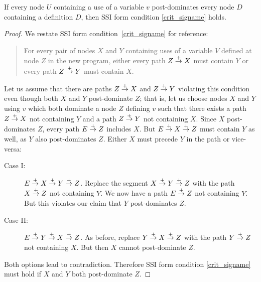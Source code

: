 \documentclass[12pt,titlepage,twoside]{article}
\begin{document}
\begin{lemma}\label{lem:rename_postdom1}
If every node $U$ containing a use of a variable $v$ post-dominates
every node $D$ containing a definition $D$, then SSI form condition
\ref{crit_signame} holds.
\end{lemma}
\begin{proof}
We restate SSI form condition~\ref{crit_signame} for reference:
\begin{quote}
For every pair of nodes $X$ and $Y$ containing uses of a
variable $V$ defined at node $Z$ in the new program, either every path
$Z \stackrel{+}{\rightarrow} X$ must contain $Y$ or every path $Z \stackrel{+}{\rightarrow} Y$ must
contain $X$.
\end{quote}
Let us assume that there are paths $Z\stackrel{+}{\rightarrow} X$ and $Z\stackrel{+}{\rightarrow} Y$
violating this condition even though both $X$ and $Y$ post-dominate
$Z$; that is, let us choose nodes $X$ and $Y$ using $v$ which both
dominate a node $Z$ defining $v$ such that there exists a path
$Z\stackrel{+}{\rightarrow} X$ not containing $Y$ and a path $Z\stackrel{+}{\rightarrow} Y$ not
containing $X$.  Since $X$ post-dominates $Z$, every path $E\stackrel{+}{\rightarrow}
Z$ includes $X$.  But $E \stackrel{+}{\rightarrow} X \stackrel{+}{\rightarrow} Z$ must contain $Y$ as
well, as $Y$ also post-dominates $Z$.  Either $X$ must precede $Y$ in
the path or vice-versa:
\begin{description}
\item[Case I:] $E \stackrel{+}{\rightarrow} X \stackrel{+}{\rightarrow} Y \stackrel{+}{\rightarrow} Z$.  Replace the
segment $X\stackrel{+}{\rightarrow} Y\stackrel{+}{\rightarrow} Z$ with the path $X\stackrel{+}{\rightarrow} Z$ not
containing $Y$.  We now have a path $E\stackrel{+}{\rightarrow} Z$ not containing
$Y$.  But this violates our claim that $Y$ post-dominates $Z$.
\item[Case II:] $E \stackrel{+}{\rightarrow} Y \stackrel{+}{\rightarrow} X \stackrel{+}{\rightarrow} Z$.  As before,
replace $Y\stackrel{+}{\rightarrow} X\stackrel{+}{\rightarrow} Z$ with the path $Y\stackrel{+}{\rightarrow} Z$ not
containing $X$.  But then $X$ cannot post-dominate $Z$.
\end{description}
Both options lead to contradiction.  Therefore SSI form condition
\ref{crit_signame} must hold if $X$ and $Y$ both post-dominate $Z$.
\end{proof}
\end{document}
